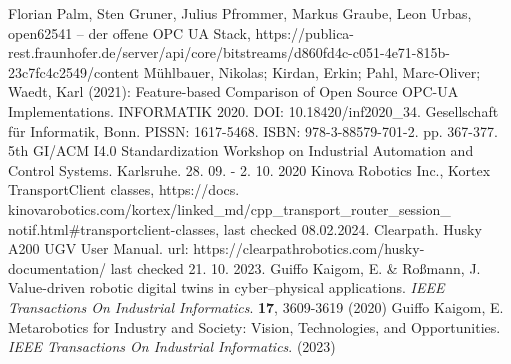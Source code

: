 \documentclass[conference]{IEEEtran}
\begin{document}
\begin{thebibliography}{00}
Florian Palm, Sten Gruner, Julius Pfrommer, Markus Graube, Leon Urbas, open62541 – der offene OPC UA Stack, https://publica-rest.fraunhofer.de/server/api/core/bitstreams/d860fd4c-c051-4e71-815b-23c7fc4c2549/content
Mühlbauer, Nikolas; Kirdan, Erkin; Pahl, Marc-Oliver; Waedt, Karl (2021): Feature-based Comparison of Open Source OPC-UA Implementations. INFORMATIK 2020. DOI: 10.18420/inf2020\_34. Gesellschaft für Informatik, Bonn. PISSN: 1617-5468. ISBN: 978-3-88579-701-2. pp. 367-377. 5th GI/ACM I4.0 Standardization Workshop on Industrial Automation and Control Systems. Karlsruhe. 28. 09. - 2. 10. 2020
 Kinova Robotics Inc., Kortex TransportClient classes, https://docs.\\kinovarobotics.com/kortex/linked\_md/cpp\_transport\_router\_session\_\\notif.html\#transportclient-classes, last checked 08.02.2024.
 Clearpath. Husky A200 UGV User Manual. url: https://clearpathrobotics.com/husky-documentation/ last checked 21. 10. 2023.
Guiffo Kaigom, E. \& Roßmann, J. Value-driven robotic digital twins in cyber–physical applications. {\em IEEE Transactions On Industrial Informatics}. \textbf{17}, 3609-3619 (2020)
Guiffo Kaigom, E. Metarobotics for Industry and Society: Vision, Technologies, and Opportunities. {\em IEEE Transactions On Industrial Informatics}. (2023)
\end{thebibliography}
\end{document}
